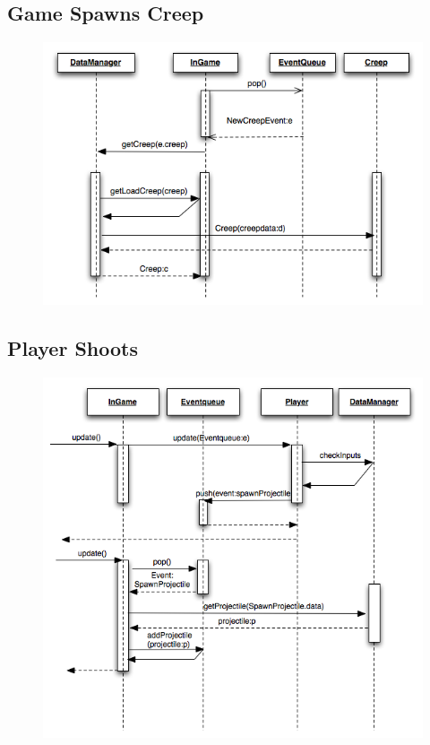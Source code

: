\subsection{Game Spawns Creep}
\begin{figure}[H]
	\begin{center}
		\includegraphics[scale=0.75]{graphics/GameSpawnsCreep}
	\end{center}
\end{figure}
	
\subsection{Player Shoots}
\begin{figure}[H]
	\begin{center}
		\includegraphics[scale=0.75]{graphics/PlayerShoots}
	\end{center}
\end{figure}


